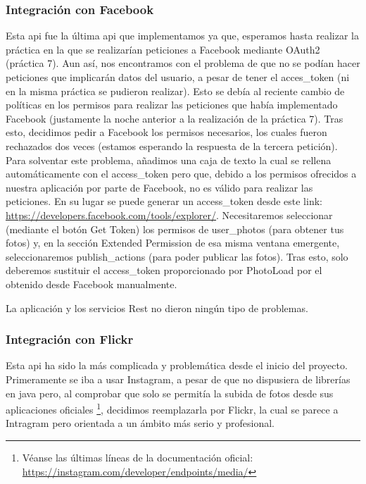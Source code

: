 \documentclass{scrartcl}
\begin{document}
\subsubsection{Integración con Facebook}
Esta api fue la última api que implementamos ya que, esperamos hasta realizar la práctica en la que se realizarían peticiones a Facebook mediante OAuth2 (práctica 7). Aun así, nos encontramos con el problema de que no se podían hacer peticiones que implicarán datos del usuario, a pesar de tener el acces\_token (ni en la misma práctica se pudieron realizar). Esto se debía al reciente cambio de políticas en los permisos para realizar las peticiones que había implementado Facebook (justamente la noche anterior a la realización de la práctica 7). Tras esto, decidimos pedir a Facebook los permisos necesarios, los cuales fueron rechazados dos veces (estamos esperando la respuesta de la tercera petición). Para solventar este problema, añadimos una caja de texto la cual se rellena automáticamente con el access\_token pero que, debido a los permisos ofrecidos a nuestra aplicación por parte de Facebook, no es válido para realizar las peticiones. En su lugar se puede generar un access\_token desde este link: \url{https://developers.facebook.com/tools/explorer/}. Necesitaremos seleccionar (mediante el botón Get Token) los permisos de user\_photos (para obtener tus fotos) y, en la sección Extended Permission de esa misma ventana emergente, seleccionaremos publish\_actions (para poder publicar las fotos). Tras esto, solo deberemos sustituir el access\_token  proporcionado por PhotoLoad por el obtenido desde Facebook manualmente.

La aplicación y los servicios Rest no dieron ningún tipo de problemas.

\subsubsection{Integración con Flickr}
Esta api ha sido la más complicada y problemática desde el inicio del proyecto. Primeramente se iba a usar Instagram, a pesar de que no dispusiera de librerías en java pero, al comprobar que solo se permitía la subida de fotos desde sus aplicaciones oficiales \footnote{Véanse las últimas líneas de la documentación oficial: \url{https://instagram.com/developer/endpoints/media/}}, decidimos reemplazarla por Flickr, la cual se parece a Intragram pero orientada a un ámbito más serio y profesional.
\end{document}
